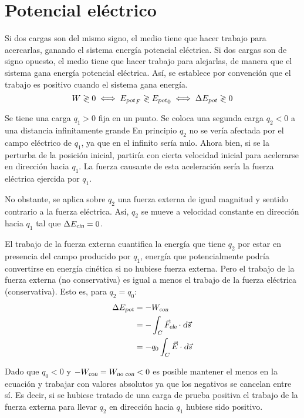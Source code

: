 \documentclass[a5paper,12pt,twoside]{book}
\begin{document}
\section{Potencial eléctrico}

Si dos cargas son del mismo signo, el medio tiene que hacer trabajo para acercarlas, ganando el sistema energía potencial eléctrica. Si dos cargas son de signo opuesto, el medio tiene que hacer trabajo para alejarlas, de manera que el sistema gana energía potencial eléctrica. Así, se establece por convención que el trabajo es positivo cuando el sistema gana energía.
\begin{equation*}
    W \gtrless 0 \iff {{{E}_\textsl{{pot}}}}_F \gtrless {{{E}_\textsl{{pot}}}}_0 \iff \Delta {{E}_\textsl{{pot}}} \gtrless 0
\end{equation*}

Se tiene una carga $q_1 > 0$ fija en un punto.
Se coloca una segunda carga $q_2 < 0$ a una distancia infinitamente grande
En principio $q_2$ no se vería afectada por el campo eléctrico de $q_1$, ya que en el infinito sería nulo.
Ahora bien, si se la perturba de la posición inicial, partiría con cierta velocidad inicial para acelerarse en dirección hacia $q_1$.
La fuerza causante de esta aceleración sería la fuerza eléctrica ejercida por $q_1$.

No obstante, se aplica sobre $q_2$ una fuerza externa de igual magnitud y sentido contrario a la fuerza eléctrica.
Así, $q_2$ se mueve a velocidad constante en dirección hacia $q_1$ tal que $\Delta {{E}_\textsl{{cin}}} = 0$.

El trabajo de la fuerza externa cuantifica la energía que tiene $q_2$ por estar en presencia del campo producido por $q_1$, energía que potencialmente podría convertirse en energía cinética si no hubiese fuerza externa.
Pero el trabajo de la fuerza externa (no conservativa) es igual a menos el trabajo de la fuerza eléctrica (conservativa). Esto es, para $q_2=q_0$:
\begin{align*}
    \Delta {{E}_\textsl{{pot}}} &= - {{W}_\textsl{{con}}}
    \\
    &= - \int_C {{\Vec{F}}_\textsl{{ele}}} \cdot \textsl{d} \Vec{s}
    \\
    &= - q_0 \int_C \Vec{E} \cdot \textsl{d} \Vec{s}
\end{align*}

Dado que $q_0 < 0$ y $-{{W}_\textsl{{con}}} = {{W}_\textsl{{no con}}} < 0$ es posible mantener el menos en la ecuación y trabajar con valores absolutos ya que los negativos se cancelan entre sí.
Es decir, si se hubiese tratado de una carga de prueba positiva el trabajo de la fuerza externa para llevar $q_2$ en dirección hacia $q_1$ hubiese sido positivo.
\end{document}
